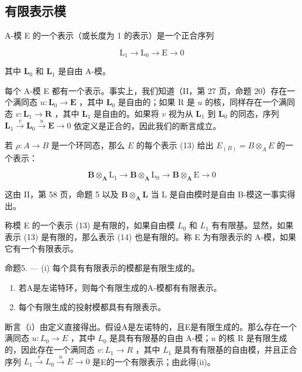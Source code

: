 \subsection{有限表示模}

A-模 E 的一个表示（或长度为 1 的表示）是一个正合序列

\[
\mathrm{L} _ {1} \rightarrow \mathrm{L} _ {0} \rightarrow \mathrm{E} \rightarrow 0\tag{13}
\]

其中 \(\mathbf{L}_0\) 和 \(\mathbf{L}_1\) 是自由 A-模。

每个 A-模 E 都有一个表示。事实上，我们知道（II，第 27 页，命题 20）存在一个满同态 \(u: \mathbf{L}_0 \to \mathbf{E}\) ，其中 \(\mathbf{L}_0\) 是自由的；如果 R 是 \(u\) 的核，同样存在一个满同态 \(v: \mathbf{L}_1 \to \mathbf{R}\) ，其中 \(\mathbf{L}_1\) 是自由的。如果将 \(v\) 视为从 \(\mathbf{L}_1\) 到 \(\mathbf{L}_0\) 的同态，序列 \(\mathbf{L}_1 \xrightarrow{v} \mathbf{L}_0 \xrightarrow{u} \mathbf{E} \longrightarrow 0\) 依定义是正合的，因此我们的断言成立。

若 \(\rho: A \to B\) 是一个环同态，那么 \(E\) 的每个表示 (13) 给出 \(E_{(B)} = B \otimes_A E\) 的一个表示：

\[
\mathbf {B} \otimes_ {\mathbf {A}} \mathrm{L} _ {1} \rightarrow \mathbf {B} \otimes_ {\mathbf {A}} \mathrm{L} _ {0} \rightarrow \mathbf {B} \otimes_ {\mathbf {A}} \mathrm{E} \rightarrow 0\tag{14}
\]

这由 II，第 58 页，命题 5 以及 \(\mathbf{B} \otimes_{\mathbf{A}} \mathbf{L}\) 当 L 是自由模时是自由 B-模这一事实得出。

称模 E 的一个表示 (13) 是有限的，如果自由模 \(L_{0}\) 和 \(L_{1}\) 有有限基。显然，如果表示 (13) 是有限的，那么表示 (14) 也是有限的。称 E 为有限表示的 A-模，如果它有一个有限表示。

命题5. --- (i) 每个具有有限表示的模都是有限生成的。

\begin{enumerate}
\def\labelenumi{(\roman{enumi})}
\setcounter{enumi}{1}
\item
  若A是左诺特环，则每个有限生成的A-模都有有限表示。
\item
  每个有限生成的投射模都具有有限表示。
\end{enumerate}

断言（i）由定义直接得出。假设A是左诺特的，且E是有限生成的。那么存在一个满同态 \(u: L_0 \to E\) ，其中 \(L_0\) 是具有有限基的自由 A-模；\(u\) 的核 R 是有限生成的，因此存在一个满同态 \(v: L_1 \to R\) ，其中 \(L_1\) 是具有有限基的自由模，并且正合序列 \(L_1 \xrightarrow{v} L_0 \xrightarrow{u} E \longrightarrow 0\) 是E的一个有限表示；由此得(ii)。

